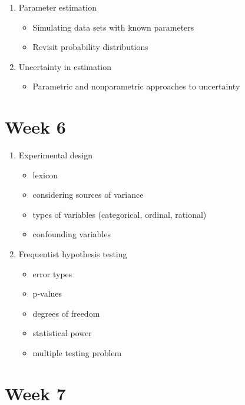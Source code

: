 \documentclass[]{book}
\providecommand{\tightlist}{%
  \setlength{\itemsep}{0pt}\setlength{\parskip}{0pt}}
\begin{document}
\begin{enumerate}
\def\labelenumi{\arabic{enumi}.}
\tightlist
\item
  Parameter estimation

  \begin{itemize}
  \tightlist
  \item
    Simulating data sets with known parameters
  \item
    Revisit probability distributions
  \end{itemize}
\item
  Uncertainty in estimation

  \begin{itemize}
  \tightlist
  \item
    Parametric and nonparametric approaches to uncertainty
  \end{itemize}
\end{enumerate}

\hypertarget{week-6}{%
\section{Week 6}\label{week-6}}

\begin{enumerate}
\def\labelenumi{\arabic{enumi}.}
\tightlist
\item
  Experimental design

  \begin{itemize}
  \tightlist
  \item
    lexicon
  \item
    considering sources of variance
  \item
    types of variables (categorical, ordinal, rational)
  \item
    confounding variables
  \end{itemize}
\item
  Frequentist hypothesis testing

  \begin{itemize}
  \tightlist
  \item
    error types
  \item
    p-values
  \item
    degrees of freedom
  \item
    statistical power
  \item
    multiple testing problem
  \end{itemize}
\end{enumerate}

\hypertarget{week-7}{%
\section{Week 7}\label{week-7}}
\end{document}
